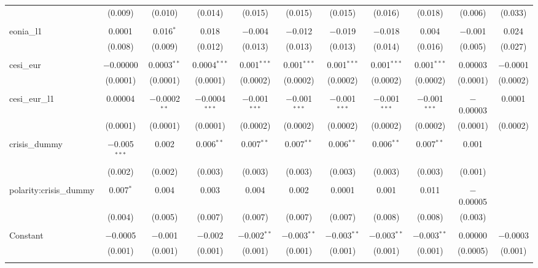\begin{table}[!htbp]
\begin{adjustbox}{width=1.35\textwidth}
\begin{tabular}{@{\extracolsep{5pt}}lcccccccccc}
  & (0.009) & (0.010) & (0.014) & (0.015) & (0.015) & (0.015) & (0.016) & (0.018) & (0.006) & (0.033) \\ 
  & & & & & & & & & & \\ 
 eonia\_l1 & 0.0001 & 0.016$^{*}$ & 0.018 & $-$0.004 & $-$0.012 & $-$0.019 & $-$0.018 & 0.004 & $-$0.001 & 0.024 \\ 
  & (0.008) & (0.009) & (0.012) & (0.013) & (0.013) & (0.013) & (0.014) & (0.016) & (0.005) & (0.027) \\ 
  & & & & & & & & & & \\ 
 cesi\_eur & $-$0.00000 & 0.0003$^{**}$ & 0.0004$^{***}$ & 0.001$^{***}$ & 0.001$^{***}$ & 0.001$^{***}$ & 0.001$^{***}$ & 0.001$^{***}$ & 0.00003 & $-$0.0001 \\ 
  & (0.0001) & (0.0001) & (0.0001) & (0.0002) & (0.0002) & (0.0002) & (0.0002) & (0.0002) & (0.0001) & (0.0002) \\ 
  & & & & & & & & & & \\ 
 cesi\_eur\_l1 & 0.00004 & $-$0.0002$^{**}$ & $-$0.0004$^{***}$ & $-$0.001$^{***}$ & $-$0.001$^{***}$ & $-$0.001$^{***}$ & $-$0.001$^{***}$ & $-$0.001$^{***}$ & $-$0.00003 & 0.0001 \\ 
  & (0.0001) & (0.0001) & (0.0001) & (0.0002) & (0.0002) & (0.0002) & (0.0002) & (0.0002) & (0.0001) & (0.0002) \\ 
  & & & & & & & & & & \\ 
 crisis\_dummy & $-$0.005$^{***}$ & 0.002 & 0.006$^{**}$ & 0.007$^{**}$ & 0.007$^{**}$ & 0.006$^{**}$ & 0.006$^{**}$ & 0.007$^{**}$ & 0.001 &  \\ 
  & (0.002) & (0.002) & (0.003) & (0.003) & (0.003) & (0.003) & (0.003) & (0.003) & (0.001) &  \\ 
  & & & & & & & & & & \\ 
 polarity:crisis\_dummy & 0.007$^{*}$ & 0.004 & 0.003 & 0.004 & 0.002 & 0.0001 & 0.001 & 0.011 & $-$0.00005 &  \\ 
  & (0.004) & (0.005) & (0.007) & (0.007) & (0.007) & (0.007) & (0.008) & (0.008) & (0.003) &  \\ 
  & & & & & & & & & & \\ 
 Constant & $-$0.0005 & $-$0.001 & $-$0.002 & $-$0.002$^{**}$ & $-$0.003$^{**}$ & $-$0.003$^{**}$ & $-$0.003$^{**}$ & $-$0.003$^{**}$ & 0.00000 & $-$0.0003 \\ 
  & (0.001) & (0.001) & (0.001) & (0.001) & (0.001) & (0.001) & (0.001) & (0.001) & (0.0005) & (0.001) \\ 
  & & & & & & & & & & \\ 

\end{tabular}
\end{adjustbox}
\end{table}
